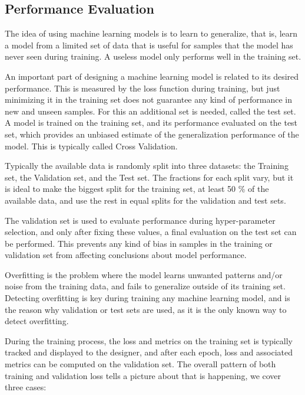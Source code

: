 \subsection{Performance Evaluation}

The idea of using machine learning models is to learn to generalize, that is, learn a model from a limited set of data that is useful for samples that the model has never seen during training. A useless model only performs well in the training set.

An  important part of designing a machine learning model is related to its desired performance. This is measured by the loss function during training, but just minimizing it in the training set does not guarantee any kind of performance in new and unseen samples. For this an additional set is needed, called the test set. A model is trained on the training set, and its performance evaluated on the test set, which provides an unbiased estimate of the generalization performance of the model. This is typically called Cross Validation.

Typically  the available data is randomly split into three datasets: the Training set, the Validation set, and the Test set. The fractions for each split vary, but it is ideal to make the biggest split for the training set, at least 50 \% of the available data, and use the rest in equal splits for the validation and test sets.

The validation set is used to evaluate performance during hyper-parameter selection, and only after fixing these values, a final evaluation on the test set can be performed. This prevents any kind of bias in samples in the training or validation set from affecting conclusions about model performance.

Overfitting  is the problem where the model learns unwanted patterns and/or noise from the training data, and fails to generalize outside of its training set. Detecting overfitting is key during training any machine learning model, and is the reason why validation or test sets are used, as it is the only known way to detect overfitting.

During the training process, the loss and metrics on the training set is typically tracked and displayed to the designer, and after each epoch, loss and associated metrics can be computed on the validation set. The overall pattern of both training and validation loss tells a picture about that is happening, we cover three cases:

